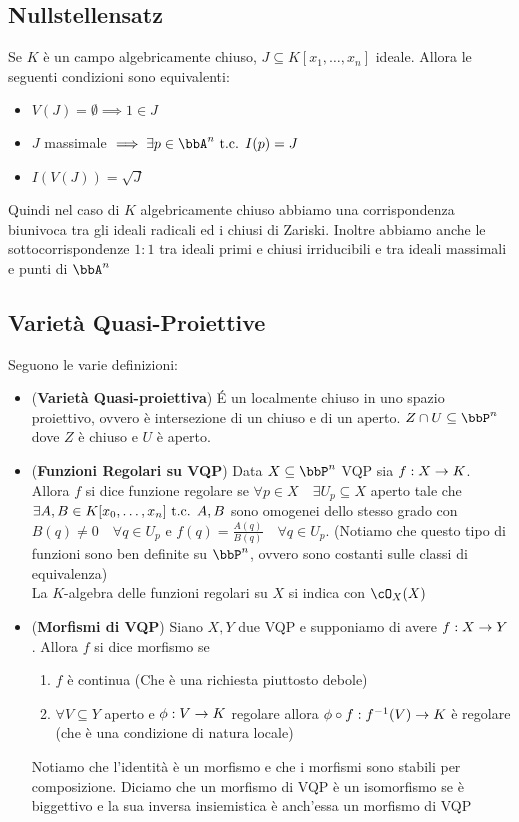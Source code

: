 \documentclass[a4paper,NoNotes,GeneralMath]{stdmdoc}
\begin{document}
	\subsection*{Nullstellensatz}
	Se $K$ è un campo algebricamente chiuso, $J \subseteq K[x_1, \ldots, x_n]$ ideale. Allora le seguenti condizioni sono equivalenti:
	\begin{itemize}
		\item $V(J) = \emptyset \implies 1 \in J$
		\item $J$ massimale $\implies \exists p \in \bbA^n \tc I(p) = J$
		\item $I(V(J)) = \sqrt{J}$
	\end{itemize}
	Quindi nel caso di $K$ algebricamente chiuso abbiamo una corrispondenza biunivoca tra gli ideali radicali ed i chiusi di Zariski. Inoltre abbiamo anche le sottocorrispondenze $1:1$ tra ideali primi e chiusi irriducibili e tra ideali massimali e punti di $\bbA^n$
	
	\subsection*{Varietà Quasi-Proiettive}
	Seguono le varie definizioni:
	\begin{itemize}
		\item ({\bf Varietà Quasi-proiettiva}) É un localmente chiuso in uno spazio proiettivo, ovvero è intersezione di un chiuso e di un aperto. $Z \cap U \subseteq \bbP^n$ dove $Z$ è chiuso e $U$ è aperto.
		\item ({\bf Funzioni Regolari su VQP}) Data $X \subseteq \bbP^n$ VQP sia $f: X \rightarrow K$. Allora $f$ si dice funzione regolare se $\forall p \in X \quad \exists U_p \subseteq X$ aperto tale che $\exists A,B \in K[x_0, \ldots, x_n] \mbox{ t.c. } A, B$ sono omogenei dello stesso grado con $B(q) \neq 0 \quad \forall q \in U_p$ e $f(q) = \frac{A(q)}{B(q)} \quad \forall q \in U_p$. (Notiamo che questo tipo di funzioni sono ben definite su $\bbP^n$, ovvero sono costanti sulle classi di equivalenza) \\
		La $K$-algebra delle funzioni regolari su $X$ si indica con $\cO_X(X)$
		\item ({\bf Morfismi di VQP}) Siano $X, Y$ due VQP e supponiamo di avere $f: X \rightarrow Y$. Allora $f$ si dice morfismo se
		\begin{enumerate}
			\item $f$ è continua (Che è una richiesta piuttosto debole)
			\item $\forall V \subseteq Y$ aperto e $\phi: V \rightarrow K$ regolare allora $\phi \circ f: f^{-1}(V) \rightarrow K$ è regolare (che è una condizione di natura locale)
		\end{enumerate}
		Notiamo che l'identità è un morfismo e che i morfismi sono stabili per composizione. Diciamo che un morfismo di VQP è un isomorfismo se è biggettivo e la sua inversa insiemistica è anch'essa un morfismo di VQP
	\end{itemize}
	
\end{document}
